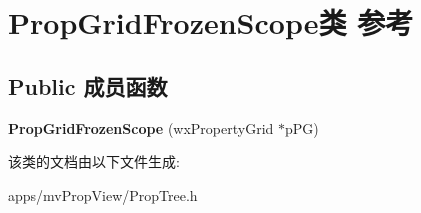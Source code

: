 \hypertarget{class_prop_grid_frozen_scope}{\section{Prop\+Grid\+Frozen\+Scope类 参考}
\label{class_prop_grid_frozen_scope}
}
\subsection*{Public 成员函数}
\begin{DoxyCompactItemize}
\item 
\hypertarget{class_prop_grid_frozen_scope_ac7dd3460f08b8362e6adef63df498399}{{\bfseries Prop\+Grid\+Frozen\+Scope} (wx\+Property\+Grid $\ast$p\+P\+G)}\label{class_prop_grid_frozen_scope_ac7dd3460f08b8362e6adef63df498399}

\end{DoxyCompactItemize}


该类的文档由以下文件生成\+:\begin{DoxyCompactItemize}
\item 
apps/mv\+Prop\+View/Prop\+Tree.\+h\end{DoxyCompactItemize}
